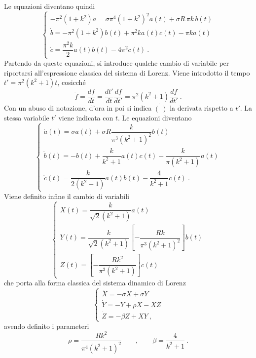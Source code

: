 %
\noindent
Le equazioni diventano quindi
\begin{equation}
    \begin{cases}
   - \pi^2 (1+k^2) \dot{a} = \sigma \pi^4 (1+k^2)^2 a(t) +  \sigma R \, \pi k \, b(t) \\
    \dot{b} = -\pi^2 (1+k^2) b(t) + \pi^2 k a(t)c(t)  - \pi k a(t)  \\
    \dot{c} = \dfrac{\pi^2 k}{2} a(t) b(t) - 4 \pi^2 c(t) \ .
    \end{cases}
\end{equation}
Partendo da queste equazioni, si introduce qualche cambio di variabile per riportarsi all'espressione classica del sistema di Lorenz.
Viene introdotto il tempo $t' = \pi^2 (k^2 + 1) t$, cosicché
\begin{equation}
    \dot{f} = \dfrac{df}{dt} = \dfrac{dt'}{dt}\dfrac{df}{dt'} =
    \pi^2 (k^2 + 1) \dfrac{df}{dt'} \ .
\end{equation}
Con un abuso di notazione, d'ora in poi si indica $\dot{(\ )}$ la derivata rispetto a $t'$. La stessa variabile $t'$ viene indicata con $t$. Le equazioni diventano
\begin{equation}
    \begin{cases}
    \dot{a}(t) = \sigma a(t) +  \sigma R \dfrac{k}{\pi^3 (k^2+1)^2} b(t) \\
    \dot{b}(t) = - b(t) + \dfrac{ k}{k^2+1} a(t)c(t)  - \dfrac{ k}{\pi(k^2+1)} a(t)  \\
    \dot{c}(t) = \dfrac{k}{2(k^2+1)} a(t) b(t) - \dfrac{4}{k^2+1}  c(t) \ .
    \end{cases}
\end{equation}
Viene definito infine il cambio di variabili 
\begin{equation}
    \begin{cases}
     X(t) = \dfrac{k}{\sqrt{2}(k^2+1)} a(t) \\
     Y(t) = \dfrac{k}{\sqrt{2}(k^2+1)}
     \left[-\dfrac{R k}{\pi^3 (k^2+1)^2}\right] b(t) \\
     Z(t) = \left[-\dfrac{R k^2}{\pi^3 (k^2+1)}\right] c(t)
    \end{cases}
\end{equation}
che porta alla forma classica del sistema dinamico di Lorenz
\begin{equation}
    \begin{cases}
      \dot{X} = - \sigma X + \sigma Y \\
      \dot{Y} = - Y + \rho X - X Z \\
      \dot{Z} = - \beta Z + X Y \ ,
    \end{cases}
\end{equation}
avendo definito i parameteri 
\begin{equation}
    \rho = \dfrac{R k^2}{\pi^4 (k^2+1)^2} \qquad , \qquad
    \beta = \dfrac{4}{k^2+1} \ .
\end{equation}



\newpage

\newpage
\clearpage


